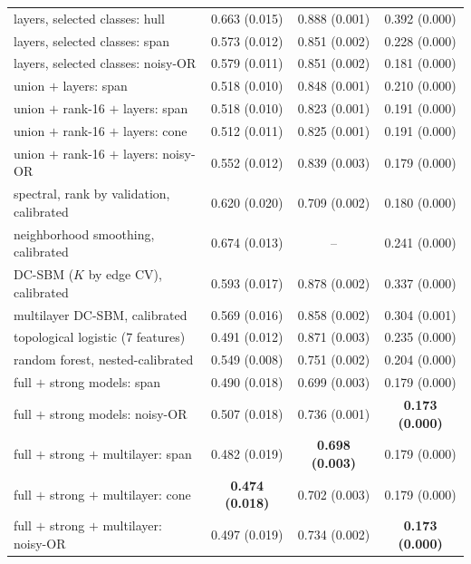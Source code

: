 \documentclass[12pt]{article}
\begin{document}
\begin{table}[htbp]
\begin{tabular}{lccc}
layers, selected classes: hull & 0.663 (0.015) & 0.888 (0.001) & 0.392 (0.000) \\
layers, selected classes: span & 0.573 (0.012) & 0.851 (0.002) & 0.228 (0.000) \\
layers, selected classes: noisy-OR & 0.579 (0.011) & 0.851 (0.002) & 0.181 (0.000) \\
union $+$ layers: span & 0.518 (0.010) & 0.848 (0.001) & 0.210 (0.000) \\
union $+$ rank-16 $+$ layers: span & 0.518 (0.010) & 0.823 (0.001) & 0.191 (0.000) \\
union $+$ rank-16 $+$ layers: cone & 0.512 (0.011) & 0.825 (0.001) & 0.191 (0.000) \\
union $+$ rank-16 $+$ layers: noisy-OR & 0.552 (0.012) & 0.839 (0.003) & 0.179 (0.000) \\
spectral, rank by validation, calibrated & 0.620 (0.020) & 0.709 (0.002) & 0.180 (0.000) \\
neighborhood smoothing, calibrated & 0.674 (0.013) & -- & 0.241 (0.000) \\
DC-SBM ($K$ by edge CV), calibrated & 0.593 (0.017) & 0.878 (0.002) & 0.337 (0.000) \\
multilayer DC-SBM, calibrated & 0.569 (0.016) & 0.858 (0.002) & 0.304 (0.001) \\
topological logistic (7 features) & 0.491 (0.012) & 0.871 (0.003) & 0.235 (0.000) \\
random forest, nested-calibrated & 0.549 (0.008) & 0.751 (0.002) & 0.204 (0.000) \\
full $+$ strong models: span & 0.490 (0.018) & 0.699 (0.003) & 0.179 (0.000) \\
full $+$ strong models: noisy-OR & 0.507 (0.018) & 0.736 (0.001) & \textbf{0.173 (0.000)} \\
full $+$ strong $+$ multilayer: span & 0.482 (0.019) & \textbf{0.698 (0.003)} & 0.179 (0.000) \\
full $+$ strong $+$ multilayer: cone & \textbf{0.474 (0.018)} & 0.702 (0.003) & 0.179 (0.000) \\
full $+$ strong $+$ multilayer: noisy-OR & 0.497 (0.019) & 0.734 (0.002) & \textbf{0.173 (0.000)} \\
\bottomrule
\end{tabular}

\end{table}
\end{document}
